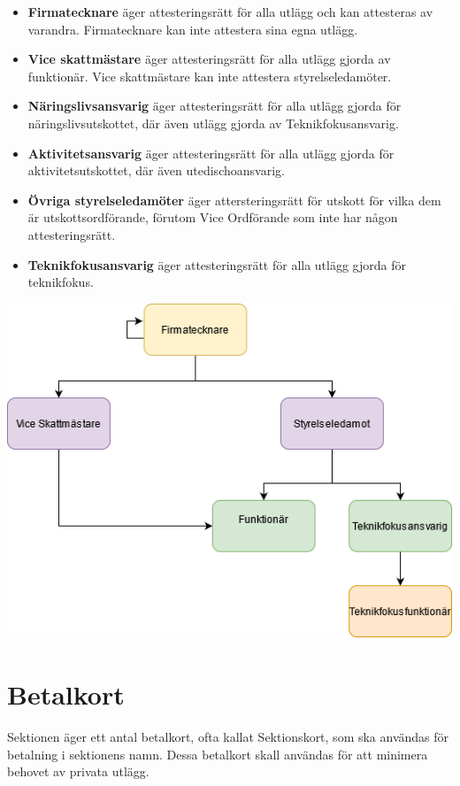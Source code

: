 \documentclass{dsekprotokoll}
\begin{document}
\begin{itemize}
    \item \textbf{Firmatecknare} äger attesteringsrätt för alla utlägg och kan attesteras av varandra. Firmatecknare kan inte attestera sina egna utlägg.
    \item \textbf{Vice skattmästare} äger attesteringsrätt för alla utlägg gjorda av funktionär. Vice skattmästare kan inte attestera styrelseledamöter.
    \item \textbf{Näringslivsansvarig} äger attesteringsrätt för alla utlägg gjorda för näringslivsutskottet, där även utlägg gjorda av Teknikfokusansvarig.
    \item \textbf{Aktivitetsansvarig} äger attesteringsrätt för alla utlägg gjorda för aktivitetsutskottet, där även utedischoansvarig.
    \item \textbf{Övriga styrelseledamöter} äger attersteringsrätt för utskott för vilka dem är utskottsordförande, förutom Vice Ordförande som inte har någon attesteringsrätt.
    \item \textbf{Teknikfokusansvarig} äger attesteringsrätt för alla utlägg gjorda för teknikfokus.
\end{itemize}
\includegraphics[width=\textwidth]{Attestering.png}

\section{Betalkort}
Sektionen äger ett antal betalkort, ofta kallat Sektionskort, som ska användas för betalning i sektionens namn. Dessa betalkort skall användas för att minimera behovet av privata utlägg.
\end{document}
